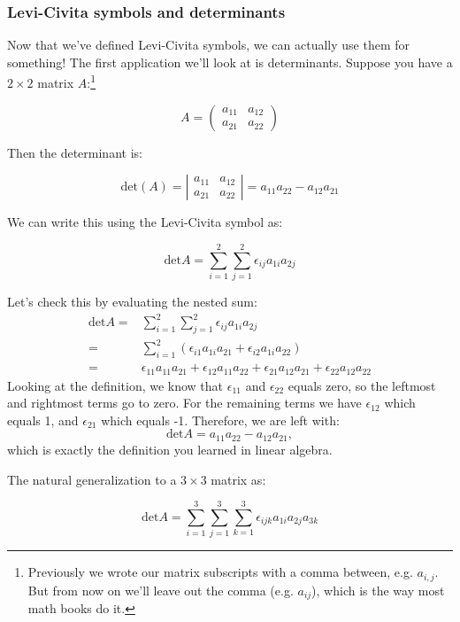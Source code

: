 \subsubsection*{Levi-Civita symbols and determinants} 
Now that we've defined Levi-Civita symbols, we can actually use them for something!  The first application we'll look at is determinants.  Suppose you have a $2 \times 2 $ matrix $A$:\footnote{Previously we wrote our matrix subscripts with a comma between, e.g. $a_{i,j}$. But from now on we'll leave out the comma (e.g. $a_{ij}$), which is the way most math books do it.}

\[ A = \left( \begin{array}{cc}
a_{11} & a_{12} \\
a_{21} & a_{22} \end{array} \right) \]

Then the determinant is:

\[ \text{det} (A) = 
 \left| \begin{array}{cc} a_{11} & a_{12} \\
a_{21} & a_{22} \end{array} \right|
= a_{11}a_{22} - a_{12}a_{21} \]

We can write this using the Levi-Civita symbol as:

\[ \text{det} A = \sum_{i=1}^2 \sum_{j=1}^2 \epsilon_{ij} a_{1i} a_{2j} \]

Let's check this by evaluating the nested sum:
\begin{align}
\text{det} A =& \sum_{i=1}^2 \sum_{j=1}^2 \epsilon_{ij} a_{1i} a_{2j} \\
=& \sum_{i=1}^2 \left( \epsilon_{i1} a_{1i} a_{21} + \epsilon_{i2} a_{1i} a_{22} \right) \\
=& \epsilon_{11} a_{11} a_{21} + \epsilon_{12} a_{11} a_{22} + \epsilon_{21} a_{12} a_{21} + \epsilon_{22} a_{12} a_{22}
\end{align}
Looking at the definition, we know that $\epsilon_{11}$ and $\epsilon_{22}$ equals zero, so the leftmost and rightmost terms go to zero.   For the remaining terms we have $\epsilon_{12}$ which equals 1, and $\epsilon_{21}$ which equals -1.  Therefore, we are left with:
\[ \text{det} A = a_{11}a_{22} - a_{12}a_{21}, \]
which is exactly the definition you learned in linear algebra.   

The natural generalization to a $3 \times 3$ matrix as:

\[ \text{det} A = \sum_{i=1}^3 \sum_{j=1}^3 \sum_{k=1}^3 \epsilon_{ijk} a_{1i} a_{2j} a_{3k} \]


